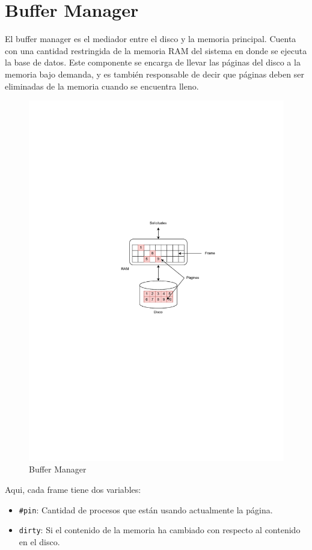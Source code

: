 \section{Buffer Manager}
El buffer manager es el mediador entre el disco y la memoria principal. Cuenta con una cantidad restringida de la memoria RAM del sistema en donde se ejecuta la base de datos. Este componente se encarga de llevar las páginas del disco a la memoria bajo demanda, y es también responsable de decir que páginas deben ser eliminadas de la memoria cuando se encuentra lleno.

\begin{figure}[h]
  \centering
  \includegraphics[width=\textwidth, trim=100 350 100 280, clip]{graphs/buffer_manager.pdf}
  \caption{Buffer Manager}
\end{figure}

Aqui, cada frame tiene dos variables:
\begin{itemize}
  \item \texttt{\#pin}: Cantidad de procesos que están usando actualmente la página.
  \item \texttt{dirty}: Si el contenido de la memoria ha cambiado con respecto al contenido en el disco.
\end{itemize}

